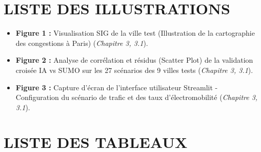 \documentclass[10pt, a4paper]{article}
\providecommand{\tightlist}{}
\begin{document}
\newpage

\section{LISTE DES ILLUSTRATIONS}\label{liste-des-illustrations}

\begin{itemize}
\tightlist
\item
  \textbf{Figure 1 :} Visualisation SIG de la ville test (Illustration
  de la cartographie des congestions à Paris) (\emph{Chapitre 3, 3.1}).
\item
  \textbf{Figure 2 :} Analyse de corrélation et résidus (Scatter Plot)
  de la validation croisée IA vs SUMO sur les 27 scénarios des 9 villes
  tests (\emph{Chapitre 3, 3.1}).
\item
  \textbf{Figure 3 :} Capture d'écran de l'interface utilisateur
  Streamlit - Configuration du scénario de trafic et des taux
  d'électromobilité (\emph{Chapitre 3, 3.1}).
\end{itemize}

\newpage

\section{LISTE DES TABLEAUX}\label{liste-des-tableaux}
\end{document}
